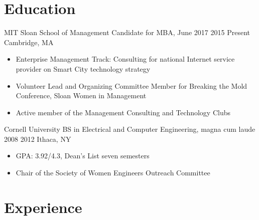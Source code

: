\documentclass[a4paper,11pt]{business}
\begin{document}


\thispagestyle{text}



\section{Education}

\entry
 {MIT Sloan School of Management}
 {Candidate for MBA, June 2017}
 {2015}
 {Present}
 {Cambridge, MA}{
 \begin{itemize}
  \item Enterprise Management Track: Consulting for national Internet service provider on Smart City technology strategy
  \item Volunteer Lead and Organizing Committee Member for Breaking the Mold Conference, Sloan Women in Management
  \item Active member of the Management Consulting and Technology Clubs
 \end{itemize}
}

\entry
 {Cornell University}
 {BS in Electrical and Computer Engineering, magna cum laude}
 {2008}
 {2012}
 {Ithaca, NY}{
 \begin{itemize}
  \item GPA: 3.92/4.3, Dean's List seven semesters
  \item Chair of the Society of Women Engineers Outreach Committee
 \end{itemize}
}


\section{Experience}
\end{document}
